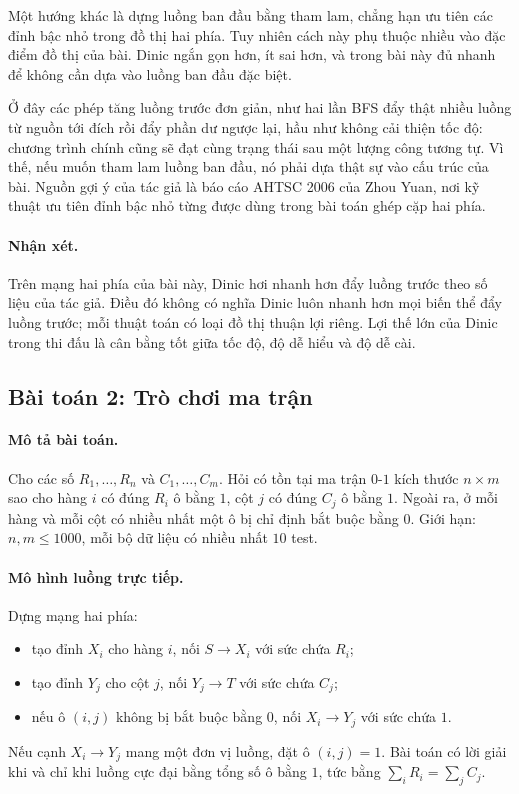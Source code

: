 \documentclass[11pt]{article}
\begin{document}
Một hướng khác là dựng luồng ban đầu bằng tham lam, chẳng hạn ưu tiên các đỉnh
bậc nhỏ trong đồ thị hai phía. Tuy nhiên cách này phụ thuộc nhiều vào đặc điểm
đồ thị của bài. Dinic ngắn gọn hơn, ít sai hơn, và trong bài này đủ nhanh để
không cần dựa vào luồng ban đầu đặc biệt.

Ở đây các phép tăng luồng trước đơn giản, như hai lần BFS đẩy thật nhiều luồng
từ nguồn tới đích rồi đẩy phần dư ngược lại, hầu như không cải thiện tốc độ:
chương trình chính cũng sẽ đạt cùng trạng thái sau một lượng công tương tự.
Vì thế, nếu muốn tham lam luồng ban đầu, nó phải dựa thật sự vào cấu trúc của
bài. Nguồn gợi ý của tác giả là báo cáo AHTSC 2006 của Zhou Yuan, nơi kỹ thuật
ưu tiên đỉnh bậc nhỏ từng được dùng trong bài toán ghép cặp hai phía.

\paragraph{Nhận xét.}
Trên mạng hai phía của bài này, Dinic hơi nhanh hơn đẩy luồng trước theo số
liệu của tác giả. Điều đó không có nghĩa Dinic luôn nhanh hơn mọi biến thể
đẩy luồng trước; mỗi thuật toán có loại đồ thị thuận lợi riêng. Lợi thế lớn
của Dinic trong thi đấu là cân bằng tốt giữa tốc độ, độ dễ hiểu và độ dễ cài.

\subsection{Bài toán 2: Trò chơi ma trận}

\paragraph{Mô tả bài toán.}
Cho các số \(R_1,\ldots,R_n\) và \(C_1,\ldots,C_m\). Hỏi có tồn tại ma trận
\(0\)-\(1\) kích thước \(n\times m\) sao cho hàng \(i\) có đúng \(R_i\) ô bằng
\(1\), cột \(j\) có đúng \(C_j\) ô bằng \(1\). Ngoài ra, ở mỗi hàng và mỗi
cột có nhiều nhất một ô bị chỉ định bắt buộc bằng \(0\). Giới hạn:
\(n,m\le 1000\), mỗi bộ dữ liệu có nhiều nhất \(10\) test.

\paragraph{Mô hình luồng trực tiếp.}
Dựng mạng hai phía:
\begin{itemize}
  \item tạo đỉnh \(X_i\) cho hàng \(i\), nối \(S\to X_i\) với sức chứa \(R_i\);
  \item tạo đỉnh \(Y_j\) cho cột \(j\), nối \(Y_j\to T\) với sức chứa \(C_j\);
  \item nếu ô \((i,j)\) không bị bắt buộc bằng \(0\), nối \(X_i\to Y_j\) với
  sức chứa \(1\).
\end{itemize}
Nếu cạnh \(X_i\to Y_j\) mang một đơn vị luồng, đặt ô \((i,j)=1\). Bài toán có
lời giải khi và chỉ khi luồng cực đại bằng tổng số ô bằng \(1\), tức bằng
\(\sum_i R_i=\sum_j C_j\).
\end{document}
